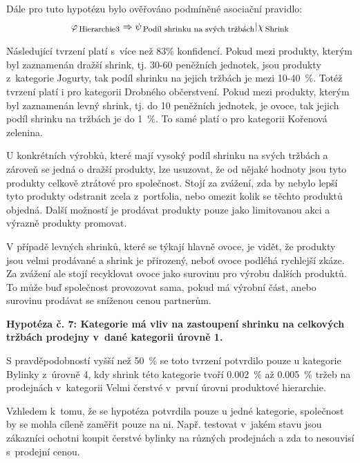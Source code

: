 Dále pro tuto hypotézu bylo ověřováno podmíněné asociační pravidlo:
\begin{equation}
    \varphi_{\mbox{\,\footnotesize Hierarchie3}} \Rightarrow \psi_{\mbox{\,\footnotesize Podíl shrinku na svých tržbách}} | \chi_{\mbox{\,\footnotesize Shrink}}
\end{equation} 

Následující tvrzení platí s~více než 83\% konfidencí.
Pokud mezi produkty, kterým byl zaznamenán dražší shrink, tj. 30-60 peněžních jednotek, jsou produkty z~kategorie Jogurty, tak podíl shrinku na jejich tržbách je mezi 10-40~\%. Totéž tvrzení platí i pro kategorii Drobného občerstvení.
Pokud mezi produkty, kterým byl zaznamenán levný shrink, tj. do 10 peněžních jednotek, je ovoce, tak jejich podíl shrinku na tržbách je do 1~\%. To samé platí o pro kategorii Kořenová zelenina.

U konkrétních výrobků, které mají vysoký podíl shrinku na svých tržbách a zároveň se jedná o dražší produkty, lze usuzovat, že od nějaké hodnoty jsou tyto produkty celkově ztrátové pro společnost. Stojí za zvážení, zda by nebylo lepší tyto produkty odstranit zcela z~portfolia, nebo omezit kolik se těchto produktů objedná. Další možností je prodávat produkty pouze jako limitovanou akci a výrazně produkty promovat.

V případě levných shrinků, které se týkají hlavně ovoce, je vidět, že produkty jsou velmi prodávané a shrink je přirozený, neboť ovoce podléhá rychlejší zkáze. Za zvážení ale stojí recyklovat ovoce jako surovinu pro výrobu dalších produktů. To může buď společnost provozovat sama, pokud má výrobní část, anebo surovinu prodávat se sníženou cenou partnerům.

\vspace*{1em}

\textbf{Hypotéza č. 7: Kategorie má vliv na zastoupení shrinku na celkových tržbách prodejny v~dané kategorii úrovně 1.}

S pravděpodobností vyšší než 50~\% se toto tvrzení potvrdilo pouze u kategorie Bylinky z~úrovně 4, kdy shrink této kategorie tvoří 0.002~\% až 0.005~\% tržeb na prodejnách v~kategorii Velmi čerstvé v~první úrovni produktové hierarchie.

Vzhledem k~tomu, že se hypotéza potvrdila pouze u jedné kategorie, společnost by se mohla cíleně zaměřit pouze na ni. Např. testovat v~jakém stavu jsou zákazníci ochotni koupit čerstvé bylinky na různých prodejnách a zda to nesouvisí s~prodejní cenou. 

\vspace*{1em}

